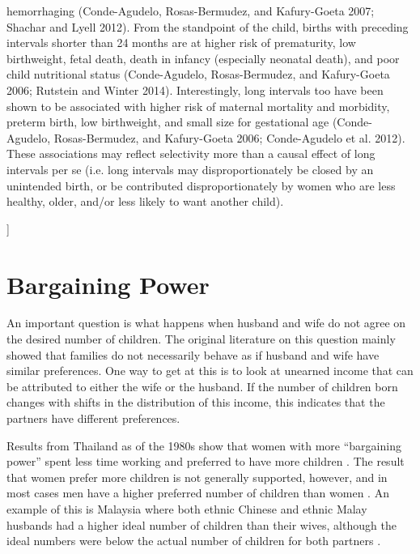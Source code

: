 \documentclass[letterpaper,12pt]{article}
\begin{document}
hemorrhaging (Conde-Agudelo, Rosas-Bermudez, and Kafury-Goeta 2007;
Shachar and Lyell 2012). From the standpoint of the child, births with
preceding intervals shorter than 24 months are at higher risk of
prematurity, low birthweight, fetal death, death in infancy (especially
neonatal death), and poor child nutritional status (Conde-Agudelo,
Rosas-Bermudez, and Kafury-Goeta 2006; Rutstein and Winter 2014).
Interestingly, long intervals too have been shown to be associated with
higher risk of maternal mortality and morbidity, preterm birth, low
birthweight, and small size for gestational age (Conde-Agudelo,
Rosas-Bermudez, and Kafury-Goeta 2006; Conde-Agudelo et al. 2012). These
associations may reflect selectivity more than a causal effect of long
intervals per se (i.e. long intervals may disproportionately be closed
by an unintended birth, or be contributed disproportionately by women
who are less healthy, older, and/or less likely to want another child).

]

\section{Bargaining Power}

An important question is what happens when husband and wife do not agree
on the desired number of children.
The original literature on this question mainly showed that families do
not necessarily behave as if husband and wife have similar preferences.
One way to get at this is to look at unearned income that can be
attributed to either the wife or the husband.
If the number of children born changes with shifts in the distribution
of this income, this indicates that the partners have different
preferences.

Results from Thailand as of the 1980s show that women with more
``bargaining power'' spent less time working and preferred to have more
children \citep{Schultz1990}.
The result that women prefer more children is not generally supported,
however, and in most cases men have a higher preferred number of
children than women \citep{Westoff2010}.
An example of this is Malaysia where both ethnic Chinese and ethnic
Malay husbands had a higher ideal number of children than their wives,
although the ideal numbers were below the actual number of children for
both partners \citep{Rasul2008}.
\end{document}
